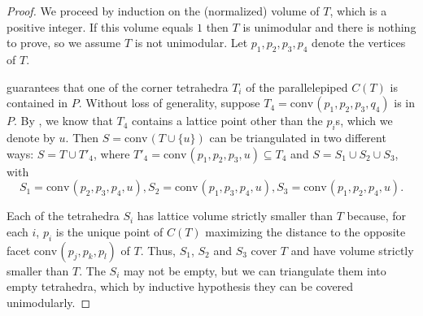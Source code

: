 \documentclass{amsart}
\theoremstyle{plain}
\theoremstyle{definition}
\newcommand{\Vol}{\operatorname{Vol}}
\newcommand{\conv}{\ensuremath{\mathrm{conv}}\hspace{1pt}}
\newcommand{\giulia}[1]{\todo[size=\tiny,color=blue!30]{#1 \\ \hfill --- G.}}
\begin{document}
\begin{proof}
We proceed by induction on the (normalized) volume of $T$, which is a positive integer. If this volume equals $1$ then $T$ is unimodular and there is nothing to prove, so we assume $T$ is not unimodular. Let $p_1, p_2, p_3, p_4$ denote the vertices of $T$.

 guarantees that one of the corner tetrahedra $T_i$ of the parallelepiped $C(T)$ is contained in $P$. Without loss of generality, suppose $T_4 = \conv(p_1, p_2, p_3,q_4)$ is in $P$. By , we know that $T_4$ contains a lattice point other than the $p_i$s, which we denote by $u$. 
%
Then $S=\conv(T\cup \{u\})$ can be triangulated in two different ways: $S=T \cup T'_4$, where $T'_4 = \conv(p_1, p_2, p_3, u) \subseteq T_4$ and $S= S_1 \cup S_2 \cup S_3$, with
\[
S_1= \conv(p_2,p_3,p_4, u),
S_2=\conv(p_1,p_3,p_4, u),
S_3=\conv(p_1,p_2,p_4, u).
\]

Each of the tetrahedra $S_i$ has lattice volume strictly smaller than $T$ because, for each $i$, $p_i$ is the unique point of $C(T)$ maximizing the distance to the opposite facet $\conv(p_j,p_k,p_l)$ of $T$. Thus, $S_1$, $S_2$ and $S_3$ cover $T$ and have volume strictly smaller than $T$. The $S_i$ may not be empty, but we can triangulate them into empty tetrahedra, which by inductive hypothesis they can be covered unimodularly.
%
%
\end{proof}
\end{document}
